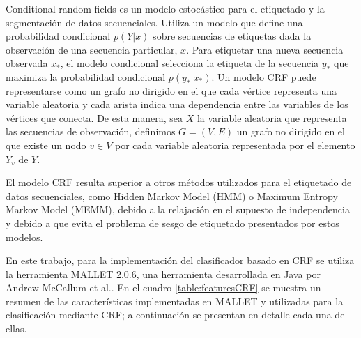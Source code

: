 \documentclass[runningheads,a4paper]{llncs}
\begin{document}
Conditional random fields\cite{LAFFERTY01} es un modelo estocástico para el etiquetado y la segmentación de datos secuenciales. Utiliza un modelo que define una probabilidad condicional $p(Y|x)$ sobre secuencias de etiquetas dada la observación de una secuencia particular, $x$. Para etiquetar una nueva secuencia observada $x_*$, el modelo condicional selecciona la etiqueta de la secuencia $y_*$ que maximiza la probabilidad condicional $p(y_*|x_*)$. Un modelo CRF puede representarse como un grafo no dirigido en el que cada vértice representa una variable aleatoria y cada arista indica una dependencia entre las variables de los vértices que conecta. De esta manera, sea $X$ la variable aleatoria que representa las secuencias de observaci\'on, definimos $G=(V,E)$ un grafo no dirigido en el que existe un nodo $v \in V$ por cada variable aleatoria representada por el elemento $Y_v$ de $Y$. 

El modelo CRF resulta superior a otros métodos utilizados para el etiquetado de datos secuenciales, como Hidden Markov Model (HMM) o Maximum Entropy Markov Model (MEMM), debido a la relajación en el supuesto de independencia y debido a que evita el problema de sesgo de etiquetado presentados por estos modelos\cite{WALLACH04}.

En este trabajo, para la implementación del clasificador basado en CRF se utiliza la herramienta MALLET 2.0.6, una herramienta desarrollada en Java por Andrew McCallum et al.\cite{MCCALLUM02}. En el cuadro \ref{table:featuresCRF} se muestra un resumen de las características implementadas en MALLET y utilizadas para la clasificación mediante CRF; a continuación se presentan en detalle cada una de ellas.
\end{document}
